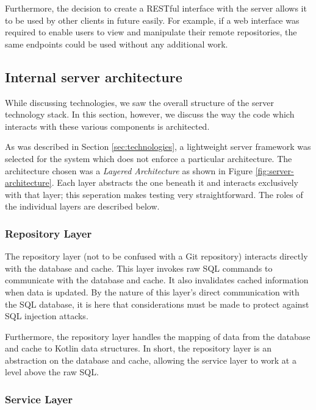 Furthermore, the decision to create a RESTful interface with the server allows it to be used by other clients in future easily. For example, if a web interface was required to enable users to view and manipulate their remote repositories, the same endpoints could be used without any additional work.

\subsection{Internal server architecture}\label{sec:server-architecture}

While discussing technologies, we saw the overall structure of the server technology stack. In this section, however, we discuss the way the code which interacts with these various components is architected.

As was described in Section \ref{sec:technologies}, a lightweight server framework was selected for the system which does not enforce a particular architecture. The architecture chosen was a \emph{Layered Architecture} as shown in Figure \ref{fig:server-architecture}. Each layer abstracts the one beneath it and interacts exclusively with that layer; this seperation makes testing very straightforward. The roles of the individual layers are described below.


\subsubsection{Repository Layer}

The repository layer (not to be confused with a Git repository) interacts directly with the database and cache. This layer invokes raw SQL commands to communicate with the database and cache. It also invalidates cached information when data is updated. By the nature of this layer's direct communication with the SQL database, it is here that considerations must be made to protect against SQL injection attacks.

Furthermore, the repository layer handles the mapping of data from the database and cache to Kotlin data structures. In short, the repository layer is an abstraction on the database and cache, allowing the service layer to work at a level above the raw SQL.


\subsubsection{Service Layer}

